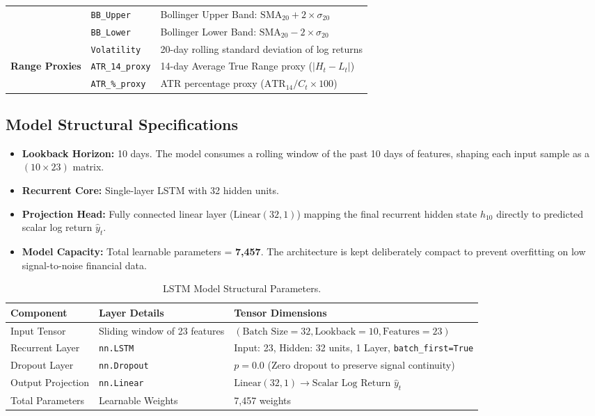 \documentclass[11pt,oneside,letterpaper,english]{article}
\begin{document}
\begin{table}[H]
\begin{tabular}{lll}
& \texttt{BB\_Upper} & Bollinger Upper Band: $\text{SMA}_{20} + 2 \times \sigma_{20}$ \\
& \texttt{BB\_Lower} & Bollinger Lower Band: $\text{SMA}_{20} - 2 \times \sigma_{20}$ \\
& \texttt{Volatility} & 20-day rolling standard deviation of log returns \\
\midrule
\textbf{Range Proxies} & \texttt{ATR\_14\_proxy} & 14-day Average True Range proxy ($|H_t - L_t|$) \\
& \texttt{ATR\_\%\_proxy} & ATR percentage proxy ($\text{ATR}_{14} / C_t \times 100$) \\
\bottomrule
\end{tabular}
\end{table}

\subsection{Model Structural Specifications}
\begin{itemize}[leftmargin=1.2cm, itemsep=2pt]
	\item \textbf{Lookback Horizon:} 10 days. The model consumes a rolling window of the past 10 days of features, shaping each input sample as a $(10 \times 23)$ matrix.
	\item \textbf{Recurrent Core:} Single-layer LSTM with 32 hidden units.
	\item \textbf{Projection Head:} Fully connected linear layer ($\text{Linear}(32, 1)$) mapping the final recurrent hidden state $h_{10}$ directly to predicted scalar log return $\hat{y}_t$.
	\item \textbf{Model Capacity:} Total learnable parameters = \textbf{7,457}. The architecture is kept deliberately compact to prevent overfitting on low signal-to-noise financial data.
\end{itemize}

\begin{table}[H]
\centering
\caption{LSTM Model Structural Parameters.}
\label{tab:final-arch}
\small
\begin{tabular}{lll}
\toprule
\textbf{Component} & \textbf{Layer Details} & \textbf{Tensor Dimensions} \\
\midrule
Input Tensor & Sliding window of 23 features & $(\text{Batch Size}=32, \text{Lookback}=10, \text{Features}=23)$ \\
Recurrent Layer & \texttt{nn.LSTM} & Input: 23, Hidden: 32 units, 1 Layer, \texttt{batch\_first=True} \\
Dropout Layer & \texttt{nn.Dropout} & $p = 0.0$ (Zero dropout to preserve signal continuity) \\
Output Projection & \texttt{nn.Linear} & $\text{Linear}(32, 1) \rightarrow \text{Scalar Log Return } \hat{y}_t$ \\
Total Parameters & Learnable Weights & 7,457 weights \\
\bottomrule
\end{tabular}
\end{table}
\end{document}
